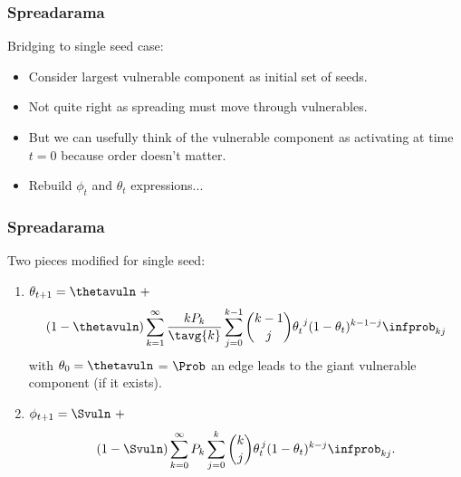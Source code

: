 \begin{frame}
  \frametitle{Spreadarama}

  \begin{block}{Bridging to single seed case:}
    \begin{itemize}
    \item<1-> 
      Consider largest vulnerable component
      as initial set of seeds.
    \item<2->
      Not quite right as spreading must move
      through vulnerables.
    \item<3->
      But we can usefully think of the vulnerable
      component as activating at time $t=0$
      because order doesn't matter.
    \item<4->
      Rebuild $\phi_t$ and $\theta_t$ expressions...
    \end{itemize}
  \end{block}

\end{frame}

\begin{frame}
  \frametitle{Spreadarama}

  \begin{block}{Two pieces modified for single seed:}
    \begin{enumerate}
    \item<1->
      $
      \theta_{t+1}
      =
      \thetavuln 
      \ +
      $
      $$
      (1-\thetavuln)
      \sum_{k=1}^{\infty}
      \frac{k P_k}{\tavg{k}}
      \sum_{j=0}^{k-1}
      \binom{k-1}{j}
      \theta_{t}^{\ j}
      (1-\theta_{t})^{k-1-j}
      \infprob_{kj}
      $$
      with $\theta_0 = \thetavuln$ = $\Prob$ an edge leads
      to the giant vulnerable component (if it exists).
    \item<1->
      $ 
      \phi_{t+1}
      = 
      \Svuln
      \ + 
      $
      $$
      (1-\Svuln)
      \sum_{k=0}^{\infty}
      P_k
      \sum_{j=0}^{k}
      \binom{k}{j}
      \theta_t^{\, j}
      (1-\theta_t)^{k-j} 
      \infprob_{kj}.
      $$
    \end{enumerate}
  \end{block}

\end{frame}


